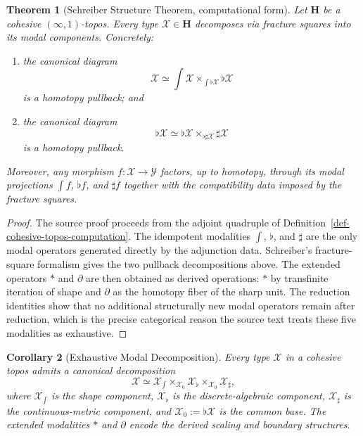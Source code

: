 \documentclass[11pt]{article}
\newtheorem{theorem}{Theorem}[section]
\newtheorem{corollary}[theorem]{Corollary}
\theoremstyle{definition}
\theoremstyle{remark}
\newcommand{\Hc}{\mathbf{H}}
\begin{document}
\begin{theorem}[Schreiber Structure Theorem, computational form]\label{thm-schreiber-structure}
Let $\Hc$ be a cohesive $(\infty,1)$-topos. Every type $\mathcal X \in \Hc$ decomposes via fracture squares into its modal components. Concretely:
\begin{enumerate}
\item the canonical diagram
\[
\mathcal X \simeq \int\mathcal X \times_{\int\flat\mathcal X} \flat\mathcal X
\]
is a homotopy pullback; and
\item the canonical diagram
\[
\flat\mathcal X \simeq \flat\mathcal X \times_{\flat\sharp\mathcal X} \sharp\mathcal X
\]
is a homotopy pullback.
\end{enumerate}
Moreover, any morphism $f : \mathcal X \to \mathcal Y$ factors, up to homotopy, through its modal projections $\int f$, $\flat f$, and $\sharp f$ together with the compatibility data imposed by the fracture squares.
\end{theorem}

\begin{proof}
The source proof proceeds from the adjoint quadruple of Definition~\ref{def-cohesive-topos-computation}. The idempotent modalities $\int$, $\flat$, and $\sharp$ are the only modal operators generated directly by the adjunction data. Schreiber's fracture-square formalism gives the two pullback decompositions above. The extended operators $\ast$ and $\partial$ are then obtained as derived operations: $\ast$ by transfinite iteration of shape and $\partial$ as the homotopy fiber of the sharp unit. The reduction identities show that no additional structurally new modal operators remain after reduction, which is the precise categorical reason the source text treats these five modalities as exhaustive.
\end{proof}

\begin{corollary}[Exhaustive Modal Decomposition]\label{cor-exhaustive-decomposition}
Every type $\mathcal X$ in a cohesive topos admits a canonical decomposition
\[
\mathcal X \simeq \mathcal X_{\int} \times_{\mathcal X_0} \mathcal X_{\flat} \times_{\mathcal X_0} \mathcal X_{\sharp},
\]
where $\mathcal X_{\int}$ is the shape component, $\mathcal X_{\flat}$ is the discrete-algebraic component, $\mathcal X_{\sharp}$ is the continuous-metric component, and $\mathcal X_0 := \flat \mathcal X$ is the common base. The extended modalities $\ast$ and $\partial$ encode the derived scaling and boundary structures.
\end{corollary}
\end{document}
